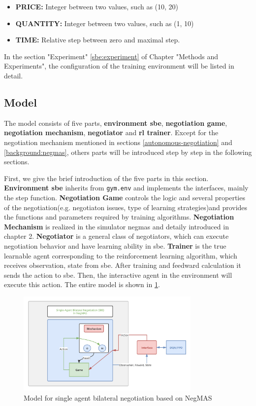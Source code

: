 \begin{itemize}
	\item \textbf{PRICE:} Integer between two values, such as (10, 20)
	\item \textbf{QUANTITY:} Integer between two values, such as (1, 10)
	\item \textbf{TIME:} Relative step between zero and maximal step.
\end{itemize}


In the section "Experiment" \ref{sbe:experiment} of Chapter "Methods and Experiments", the configuration of the training environment will be listed in detail.
 
\subsection{Model}
The model consists of five parts, \textbf{environment \gls{sbe}}, \textbf{negotiation game}, \textbf{negotiation mechanism}, \textbf{negotiator} and \textbf{\gls{rl} trainer}.
Except for the negotiation mechanism mentioned in sections \ref{autonomous-negotiation} and \ref{background:negmas}, others parts will be introduced step by step in the following sections. 

First, we give the brief introduction of the five parts in this section.
\textbf{Environment \gls{sbe}} inherits from \texttt{gym.env} and implements the interfaces, mainly the step function. 
\textbf{Negotiation Game} controls the logic and several properties of the negotiation(e.g. negotiaton issues, type of learning strategies)and provides the functions and parameters required by training algorithms.
\textbf{Negotiation Mechanism} is realized in the simulator \gls{negmas} and detaily introduced in chapter 2.
\textbf{Negotiator} is a general class of negotiators, which can execute negotiation behavior and have learning ability in \gls{sbe}.
\textbf{Trainer} is the true learnable agent corresponding to the reinforcement learning algorithm, which receives observation, state from \gls{sbe}. After training and feedward calculation it sends the action to \gls{sbe}. Then, the interactive agent in the environment will execute this action. The entire model is shown in \ref{fig:environment-single-agent}.
\begin{figure}[htbp]
\centering
\includegraphics[width=0.80\textwidth]{./images/sbe.png}
\caption{Model for single agent bilateral negotiation based on NegMAS}
\label{fig:environment-single-agent}
\end{figure}

